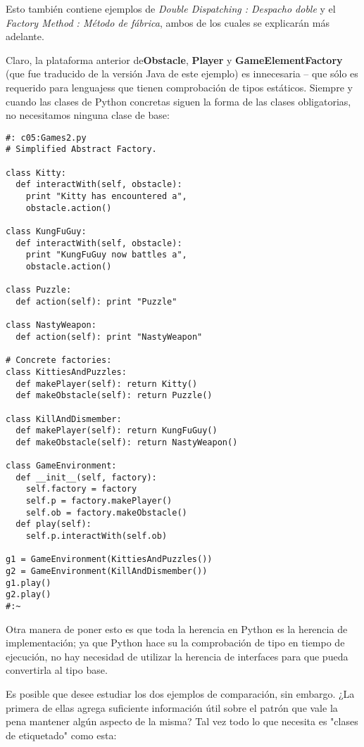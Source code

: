 Esto también contiene ejemplos de \textit{Double Dispatching : Despacho doble} y el \textit{Factory Method : Método de fábrica}, ambos de los cuales se explicarán más adelante.  \newline

Claro, la plataforma anterior de\textbf{Obstacle}, \textbf{Player} y \textbf{GameElementFactory} (que fue traducido de la versión Java de este ejemplo) es innecesaria – que sólo es requerido para lenguajess que tienen comprobación de tipos estáticos. Siempre y cuando las clases de Python concretas siguen la forma de las clases obligatorias, no necesitamos ninguna clase de base:  \newline

\begin{lstlisting}  
#: c05:Games2.py 
# Simplified Abstract Factory. 

class Kitty: 
  def interactWith(self, obstacle): 
    print "Kitty has encountered a", 
    obstacle.action() 
    
class KungFuGuy: 
  def interactWith(self, obstacle): 
    print "KungFuGuy now battles a", 
    obstacle.action() 
    
class Puzzle: 
  def action(self): print "Puzzle"  
  
class NastyWeapon: 
  def action(self): print "NastyWeapon"  
  
# Concrete factories:
class KittiesAndPuzzles: 
  def makePlayer(self): return Kitty() 
  def makeObstacle(self): return Puzzle() 
  
class KillAndDismember: 
  def makePlayer(self): return KungFuGuy() 
  def makeObstacle(self): return NastyWeapon() 
  
class GameEnvironment: 
  def __init__(self, factory): 
    self.factory = factory 
    self.p = factory.makePlayer()  
    self.ob = factory.makeObstacle() 
  def play(self):  
    self.p.interactWith(self.ob)  
    
g1 = GameEnvironment(KittiesAndPuzzles()) 
g2 = GameEnvironment(KillAndDismember()) 
g1.play()  
g2.play()  
#:~ 
\end{lstlisting}

Otra manera de poner esto es que toda la herencia en Python es la herencia de implementación; ya que Python hace su la comprobación de tipo en tiempo de ejecución, no hay necesidad de utilizar la herencia de interfaces para que pueda convertirla al tipo base.  \newline

Es posible que desee estudiar los dos ejemplos de comparación, sin embargo. ¿La primera de ellas agrega suficiente información útil sobre el patrón que vale la pena mantener algún aspecto de la misma? Tal vez todo lo que necesita es "clases de etiquetado" como esta:    \newline

